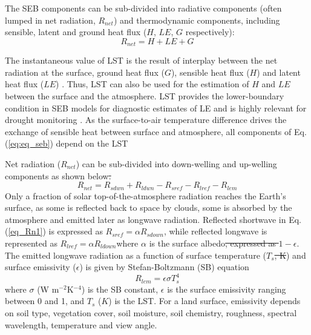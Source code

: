 \documentclass[fleqn,10pt]{wlscirep}
\providecommand{\DIFaddtex}[1]{{\protect\color{blue}\uwave{#1}}} %
\providecommand{\DIFdeltex}[1]{{\protect\color{red}\sout{#1}}}                      %
\providecommand{\DIFaddbegin}{} %
\providecommand{\DIFaddend}{} %
\providecommand{\DIFdelbegin}{} %
\providecommand{\DIFdelend}{} %
\providecommand{\DIFadd}[1]{\texorpdfstring{\DIFaddtex{#1}}{#1}} %
\providecommand{\DIFdel}[1]{\texorpdfstring{\DIFdeltex{#1}}{}} %
\begin{document}
The SEB components can be sub-divided into radiative components (often lumped in net radiation, $R_{net}$) and thermodynamic components, including sensible, latent and ground heat flux ($H$, $LE$, $G$ respectively):
\begin{equation}\label{eq:eq_seb}
R_{net} = H + LE + G 
\end{equation}

The instantaneous value of LST is the result of interplay between the net radiation at the surface, ground heat flux ($G$), sensible heat flux ($H$) and latent heat flux ($LE$) \cite{wang2013global}. Thus, LST can also be used for the estimation of $H$ \cite{sun1995relationship} and $LE$ \cite{jacob2001comprehensive} between the surface and the atmosphere. LST provides the lower-boundary condition in SEB models for diagnostic estimates of LE  and is highly relevant for drought monitoring \cite{trebs2021role,mallick2016canopy,mallick2015reintroducing}. As the surface-to-air temperature difference drives the exchange of sensible heat between surface and atmosphere, all components of Eq. (\ref{eq:eq_seb}) depend on the LST\DIFaddbegin \DIFadd{.
 }\DIFaddend 

 
 Net radiation ($R_{net}$) can be sub-divided into down-welling and up-welling components \cite{verma2016global} as shown below\DIFdelbegin \DIFdel{.
}\DIFdelend \DIFaddbegin \DIFadd{:
}\DIFaddend \begin{equation}\label{eq_Rn1}
R_{net} = R_{sdwn} + R_{ldwn} - R_{sref} - R_{lref} - R_{lem}
\end{equation}
 Only a fraction of solar top-of-the-atmosphere radiation reaches the Earth's surface, as some is reflected back to space by clouds, some is absorbed by the atmosphere and emitted later as longwave radiation. Reflected shortwave in Eq. ({\ref{eq_Rn1}}) is expressed as $R_{sref} = \alpha R_{sdown}$, while reflected longwave is represented as $R_{lref} = \alpha R_{ldown}$\DIFaddbegin \DIFadd{, }\DIFaddend where $\alpha$ is the surface albedo\DIFdelbegin \DIFdel{, expressed as $1 - \epsilon$}\DIFdelend . The emitted longwave radiation as a function of surface temperature ($T_s$\DIFdelbegin \DIFdel{, K}\DIFdelend ) and surface emissivity ($\epsilon$) is given by Stefan-Boltzmann (SB) equation \cite{lhomme1988radiative}
\begin{equation}\label{eq_Rlem}
R_{lem}= \epsilon \sigma T_{s}^{4}
\end{equation}
where $\sigma$ (W m$^{-2}$K$^{-4}$) is the SB constant, $\epsilon$ is the surface emissivity ranging between 0 and 1, and $T_{s}$ ($K$) is the LST. For a land surface, emissivity depends on soil type, vegetation cover, soil moisture, soil chemistry, roughness, spectral wavelength, temperature and view angle\cite{norman1995terminology}. 
\end{document}

